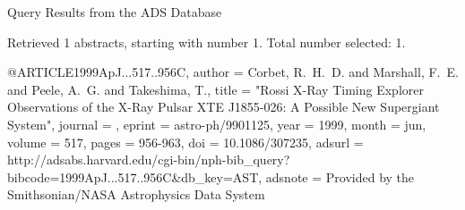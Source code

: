 Query Results from the ADS Database


Retrieved 1 abstracts, starting with number 1.  Total number selected: 1.

@ARTICLE{1999ApJ...517..956C,
   author = {{Corbet}, R.~H.~D. and {Marshall}, F.~E. and {Peele}, A.~G. and 
	{Takeshima}, T.},
    title = "{Rossi X-Ray Timing Explorer Observations of the X-Ray Pulsar XTE J1855-026: A Possible New Supergiant System}",
  journal = {\apj},
   eprint = {astro-ph/9901125},
     year = 1999,
    month = jun,
   volume = 517,
    pages = {956-963},
      doi = {10.1086/307235},
   adsurl = {http://adsabs.harvard.edu/cgi-bin/nph-bib_query?bibcode=1999ApJ...517..956C&db_key=AST},
  adsnote = {Provided by the Smithsonian/NASA Astrophysics Data System}
}


